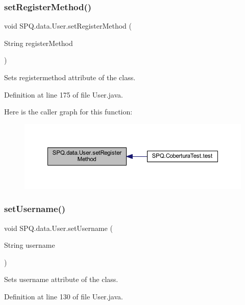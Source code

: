 \subsubsection{\texorpdfstring{set\+Register\+Method()}{setRegisterMethod()}}
{\footnotesize\ttfamily void S\+P\+Q.\+data.\+User.\+set\+Register\+Method (\begin{DoxyParamCaption}\item[{String}]{register\+Method }\end{DoxyParamCaption})}

Sets registermethod attribute of the class. 

Definition at line 175 of file User.\+java.

Here is the caller graph for this function\+:\nopagebreak
\begin{figure}[H]
\begin{center}
\leavevmode
\includegraphics[width=350pt]{class_s_p_q_1_1data_1_1_user_a6519805f5204c8d1add91a917634f588_icgraph}
\end{center}
\end{figure}
\mbox{\label{class_s_p_q_1_1data_1_1_user_ab173655f6fbe57a59cd0da8d0cfbed06}} 
\subsubsection{\texorpdfstring{set\+Username()}{setUsername()}}
{\footnotesize\ttfamily void S\+P\+Q.\+data.\+User.\+set\+Username (\begin{DoxyParamCaption}\item[{String}]{username }\end{DoxyParamCaption})}

Sets username attribute of the class. 

Definition at line 130 of file User.\+java.


